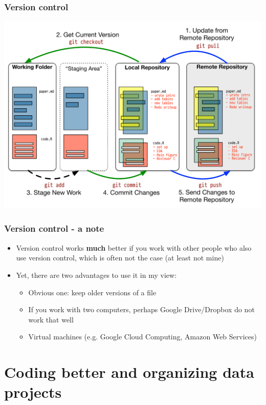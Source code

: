 \documentclass[aspectratio=43]{beamer}
\begin{document}
\begin{frame}
\frametitle{Version control}
\centering

\includegraphics[width = \textwidth]{img/git-basic}

\end{frame}

\begin{frame}
\frametitle{Version control - a note}
\centering

\begin{itemize}
  \item Version control works \textbf{much} better if you work with other people who also use version control, which is often not the case (at least not mine)
  \item Yet, there are two advantages to use it in my view:
  \begin{itemize}
    \item Obvious one: keep older versions of a file
    \item If you work with two computers, perhaps Google Drive/Dropbox do not work that well
    \item Virtual machines (e.g. Google Cloud Computing, Amazon Web Services)
  \end{itemize}
\end{itemize}

\end{frame}

\section{Coding better and organizing data projects}
\end{document}
